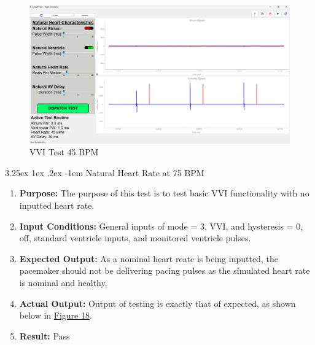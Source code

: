 \documentclass{article}
\makeatletter
\renewcommand\paragraph{\@startsection{paragraph}{5}{\z@}%
  {3.25ex \@plus1ex \@minus.2ex}%
  {-1em}%
  {\normalfont\normalsize\bfseries}}
\makeatother
\begin{document}
\begin{tcolorbox}
    \begin{figure}[H]\label{VVItest45}
        \includegraphics[width=\textwidth]{VVItest35.png}
        \caption{VVI Test 45 BPM}
        
    \end{figure}
\end{tcolorbox}

\newpage
\paragraph{Natural Heart Rate at 75 BPM}

\begin{enumerate}[label=]
   \item \textbf{Purpose:} The purpose of this test is to test basic VVI functionality with no inputted heart rate.
   \item \textbf{Input Conditions:} General inputs of mode = 3, VVI, and hysteresis = 0, off, standard ventricle 
   inputs, and monitored ventricle pulses.
   \item \textbf{Expected Output:} As a nominal heart reate is being inputted, the pacemaker should not be delivering pacing pulses 
   as the simulated heart rate is nominal and healthy.
   \item \textbf{Actual Output:} Output of testing is exactly that of expected, as shown below in \hyperref[VVItest45]{Figure 18}.
   \item \textbf{Result:} Pass
\end{enumerate}
\end{document}
